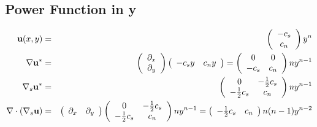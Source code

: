 \documentclass[11pt]{report}
\begin{document}
\subsection{Power Function in y\label{power_y}}
\begin{eqnarray}
{\bf u}(x,y) &=& \left( \begin{array}{c} -c_s \\ c_n \end{array}   \right)y^{n} \\
\nabla{\bf u}^* &=& \left( \begin{array}{c} \partial_x \\ \partial_y \end{array}   \right) \left( \begin{array}{cc} -c_sy & c_ny \end{array}   \right)
 =  \left( \begin{array}{cc}  0 & 0 \\ -c_s & c_n  \end{array}   \right) ny^{n-1}\\
\nabla_s{\bf u}^* &=&  \left( \begin{array}{cc} 0 & -\frac{1}{2}c_s \\ -\frac{1}{2}c_s & c_n \end{array}   \right) ny^{n-1}\\
\nabla\cdot\left(\nabla_s{\bf u}\right) &=&  \left( \begin{array}{cc} \partial_x & \partial_y \end{array}   \right) 
\left( \begin{array}{cc} 0 & -\frac{1}{2}c_s \\ -\frac{1}{2}c_s & c_n \end{array}   \right) ny^{n-1}
= \left( \begin{array}{cc} -\frac{1}{2}c_s & c_n \end{array}   \right) n(n-1)y^{n-2}
\end{eqnarray}
\end{document}
